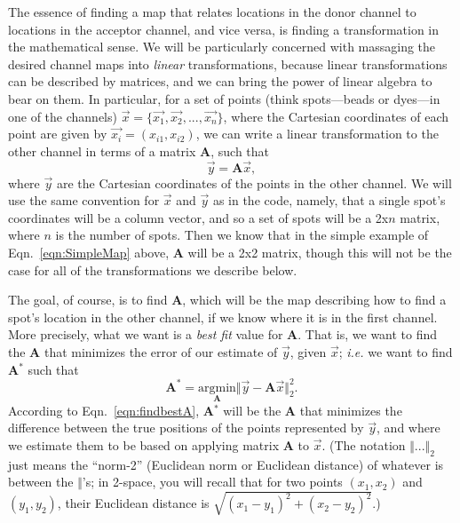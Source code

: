 \documentclass[11pt]{article}
\begin{document}
The essence of finding a map that relates locations in the donor channel to locations in the acceptor channel, and vice versa, is finding a transformation in the mathematical sense.  We will be particularly concerned with massaging the desired channel maps into \textit{linear} transformations, because linear transformations can be described by matrices, and we can bring the power of linear algebra to bear on them.  In particular, for a set of points (think spots---beads or dyes---in one of the channels) $\vec{x} = \{\vec{x_1},\vec{x_2},...,\vec{x_n}\}$, where the Cartesian coordinates of each point are given by $\vec{x_i} = (x_{i1},x_{i2})$, we can write a linear transformation to the other channel in terms of a matrix {\bf A}, such that 
\begin{equation}
\vec{y} = \mathbf{A}\vec{x}, \label{eqn:SimpleMap}
\end{equation}
where $\vec{y}$ are the Cartesian coordinates of the points in the other channel.  We will use the same convention for $\vec{x}$ and $\vec{y}$ as in the code, namely, that a single spot's coordinates will be a column vector, and so a set of spots will be a 2x$n$ matrix, where $n$ is the number of spots.  Then we know that in the simple example of Eqn.~\eqref{eqn:SimpleMap} above, {\bf A} will be a 2x2 matrix, though this will not be the case for all of the transformations we describe below.  

The goal, of course, is to find {\bf A}, which will be the map describing how to find a spot's location in the other channel, if we know where it is in the first channel. More precisely, what we want is a {\it best fit} value for {\bf A}. That is, we want to find the {\bf A} that minimizes the error of our estimate of $\vec{y}$, given $\vec{x}$; {\it i.e.} we want to find {\bf A$^*$} such that
\begin{equation}
\mathbf{A^*} = \underset{\mathbf{A}}{\textrm{argmin}}\Vert {\vec y} - \mathbf{A}\vec{x}\Vert_2^2. \label{eqn:findbestA}
\end{equation}
According to Eqn.~\eqref{eqn:findbestA}, {\bf A$^*$} will be the {\bf A} that minimizes the difference between the true positions of the points represented by $\vec{y}$, and where we estimate them to be based on applying matrix {\bf A} to $\vec{x}$. (The notation $\Vert ... \Vert_2$ just means the ``norm-2'' (Euclidean norm or Euclidean distance) of whatever is between the $\Vert$'s; in 2-space, you will recall that for two points $(x_1,x_2)$ and $(y_1,y_2)$, their Euclidean distance is $\sqrt{(x_1-y_1)^2+(x_2-y_2)^2}$.) 
\end{document}
